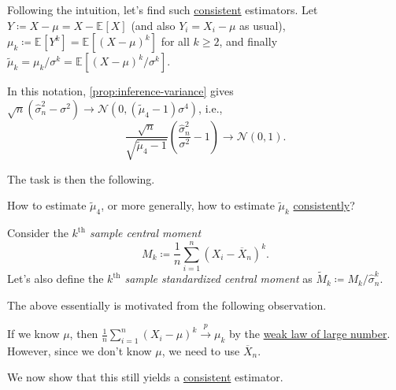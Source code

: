 Following the intuition, let's find such \hyperref[def:consistent]{consistent} estimators. Let \(Y \coloneqq X - \mu = X - \mathbb{E}_{}[X] \) (and also \(Y_i = X_i - \mu \) as usual), \(\mu _k \coloneqq \mathbb{E}_{}[Y^k] = \mathbb{E}_{}[(X - \mu )^k] \) for all \(k \geq 2\), and finally \(\widetilde{\mu} _k = \mu _k / \sigma ^k = \mathbb{E}_{}\left[ (X-\mu )^k / \sigma ^k \right] \).

\begin{prev}
	In this notation, \autoref{prop:inference-variance} gives \(\sqrt{n} (\hat{\sigma} _n^2 - \sigma ^2) \to \mathcal{N} (0, (\widetilde{\mu} _4 - 1)\sigma ^4) \), i.e.,
	\[
		\frac{\sqrt{n} }{\sqrt{\widetilde{\mu} _4 - 1} } \left( \frac{\hat{\sigma} _n^2}{\sigma ^2} - 1 \right) \to \mathcal{N} (0, 1).
	\]
\end{prev}

The task is then the following.

\begin{problem*}
	How to estimate \(\widetilde{\mu} _4\), or more generally, how to estimate \(\widetilde{\mu} _k\) \hyperref[def:consistent]{consistently}?
\end{problem*}
\begin{answer}
	Consider the \emph{\(k^{\text{th} }\) sample central moment}
	\[
		M_k
		\coloneqq \frac{1}{n} \sum_{i=1}^{n} (X_i - \overline{X} _n)^k .
	\]
	Let's also define the \emph{\(k^{\text{th} }\) sample standardized central moment} as \(\widetilde{M} _k \coloneqq M_k / \hat{\sigma} _n^k\).
\end{answer}

The above essentially is motivated from the following observation.

\begin{intuition}
	If we know \(\mu \), then \(\frac{1}{n} \sum_{i=1}^{n} (X_i - \mu )^k \overset{p}{\to} \mu _k\) by the \hyperref[thm:WLLN]{weak law of large number}. However, since we don't know \(\mu \), we need to use \(\overline{X} _n\).
\end{intuition}

We now show that this still yields a \hyperref[def:consistent]{consistent} estimator.


